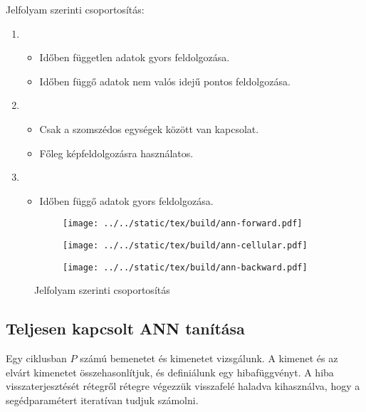 \documentclass[../../main.tex]{subfiles}
\begin{document}
Jelfolyam szerinti csoportosítás:
\begin{enumerate}
  \item {}
        \begin{itemize}
          \item Időben független adatok gyors feldolgozása.
          \item Időben függő adatok nem valós idejű pontos feldolgozása.
        \end{itemize}
  \item {}
        \begin{itemize}
          \item Csak a szomszédos egységek között van kapcsolat.
          \item Főleg képfeldolgozásra használatos.
        \end{itemize}
  \item {}
        \begin{itemize}
          \item Időben függő adatok gyors feldolgozása.
        \end{itemize}
\end{enumerate}

\begin{figure}[H]
  \centering
  \hfill
  \begin{subfigure}[c]{.35\textwidth}
    \centering
    \texttt{[image: ../../static/tex/build/ann-forward.pdf]}
  \end{subfigure}
  \hfill
  \begin{subfigure}[c]{.25\textwidth}
    \centering
    \texttt{[image: ../../static/tex/build/ann-cellular.pdf]}
  \end{subfigure}
  \hfill
  \begin{subfigure}[c]{.35\textwidth}
    \centering
    \texttt{[image: ../../static/tex/build/ann-backward.pdf]}
  \end{subfigure}
  \hfill
  \caption{Jelfolyam szerinti csoportosítás}
  \label{fig:ann-flow}
\end{figure}

\subsection{Teljesen kapcsolt ANN tanítása}

Egy ciklusban $P$ számú bemenetet és kimenetet vizsgálunk.
A kimenet és az elvárt kimenetet összehasonlítjuk, és definiálunk egy
hibafüggvényt. A hiba visszaterjesztését rétegről rétegre végezzük visszafelé
haladva kihasználva, hogy a segédparamétert iteratívan tudjuk számolni.
\end{document}
